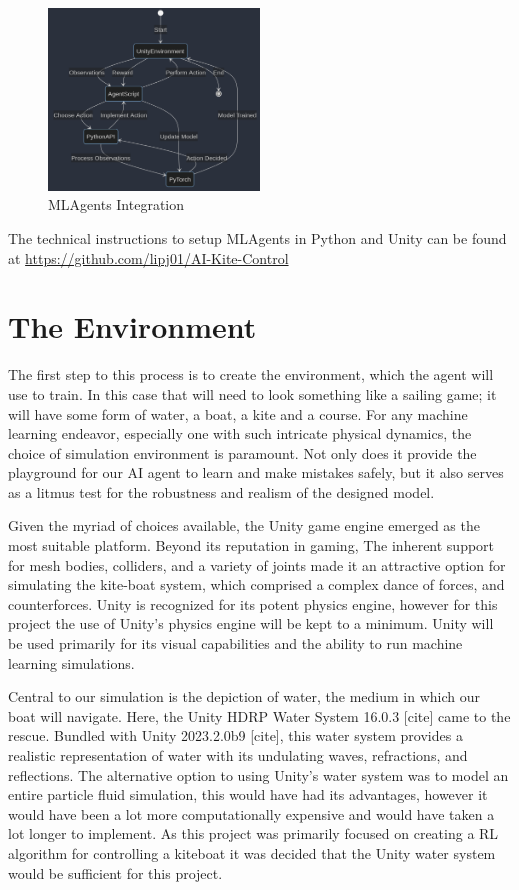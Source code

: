 \begin{figure}[h]
    \centering
    \includegraphics[width=0.5\textwidth]{Images/unity_mlagents.png}
    \caption{MLAgents Integration}\label{MLAgents_Integration}
\end{figure}



The technical instructions to setup MLAgents in Python and Unity can be found at 
\url{https://github.com/lipj01/AI-Kite-Control}

\section{The Environment}

The first step to this process is to create the environment, which the agent will use to train. In this case that will need to look something like a sailing game; it will have some form of water, a boat, a kite and a course. 
For any machine learning endeavor, especially one with such intricate physical dynamics, the choice of simulation environment is paramount. Not only does it provide the playground for our AI agent to learn and make mistakes safely, but it also serves as a litmus test for the robustness and realism of the designed model.

Given the myriad of choices available, the Unity game engine emerged as the most suitable platform. Beyond its reputation in gaming, 
The inherent support for mesh bodies, colliders, and a variety of joints made it an attractive option for simulating the kite-boat system, which comprised a complex dance of forces, and counterforces.
Unity is recognized for its potent physics engine, however for this project the use of Unity's physics engine will be kept to a minimum. Unity will be used primarily for its visual capabilities and the ability to run machine learning simulations. 

Central to our simulation is the depiction of water, the medium in which our boat will navigate. Here, the Unity HDRP Water System 16.0.3 [cite] came to the rescue. Bundled with Unity 2023.2.0b9 [cite], this water system provides a realistic representation of water with its undulating waves, refractions, and reflections. 
The alternative option to using Unity's water system was to model an entire particle fluid simulation, this would have had its advantages, however it would have been a lot more computationally expensive and would have taken a lot longer to implement. As this project was primarily focused on creating a RL algorithm for controlling a kiteboat it was decided that the Unity water system would be sufficient for this project.  

